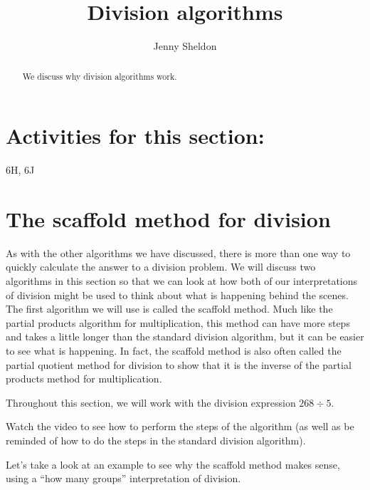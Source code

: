 \documentclass{ximera}
\title{Division algorithms}
\author{Jenny Sheldon}
\begin{document}
\begin{abstract}
We discuss why division algorithms work.
\end{abstract}
\maketitle

\section{Activities for this section:} 6H, 6J

\section{The scaffold method for division}

As with the other algorithms we have discussed, there is more than one way to quickly calculate the answer to a division problem. We will discuss two algorithms in this section so that we can look at how both of our interpretations of division might be used to think about what is happening behind the scenes. The first algorithm we will use is called the scaffold method. Much like the partial products algorithm for multiplication, this method can have more steps and takes a little longer than the standard division algorithm, but it can be  easier to see what is happening. In fact, the scaffold method is also often called the partial quotient method for division to show that it is the inverse of the partial products method for multiplication.

Throughout this section, we will work with the division expression $268 \div 5$.

Watch the video to see how to perform the steps of the algorithm (as well as be reminded of how to do the steps in the standard division algorithm).


Let's take a look at an example to see why the scaffold method makes sense, using a ``how many groups'' interpretation of division.
\end{document}
